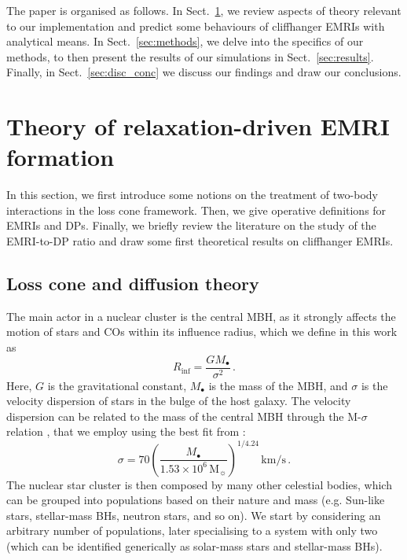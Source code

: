 \documentclass[desactivate]{aa}
\begin{document}
   The paper is organised as follows. In Sect.\ \ref{sec:theory}, we review aspects of theory relevant to our implementation and predict some behaviours of cliffhanger EMRIs with analytical means. In Sect.\ \ref{sec:methods}, we delve into the specifics of our methods, to then present the results of our simulations in Sect.\ \ref{sec:results}. Finally, in Sect.\ \ref{sec:disc_conc} we discuss our findings and draw our conclusions.


\section{Theory of relaxation-driven EMRI formation} \label{sec:theory}   

    In this section, we first introduce some notions on the treatment of two-body interactions in the loss cone framework. Then, we give operative definitions for EMRIs and DPs. Finally, we briefly review the literature on the study of the EMRI-to-DP ratio and draw some first theoretical results on cliffhanger EMRIs.

    \subsection{Loss cone and diffusion theory} \label{sec:losscone_diff}

        The main actor in a nuclear cluster is the central MBH, as it strongly affects the motion of stars and COs within its influence radius, which we define in this work as \citep{1972ApJ...178..371P}
        \begin{equation}
            R_\mathrm{inf} = \frac{G M_\bullet}{\sigma^2} \, .
        \end{equation}
        Here, $G$ is the gravitational constant, $M_\bullet$ is the mass of the MBH, and $\sigma$ is the velocity dispersion of stars in the bulge of the host galaxy. The velocity dispersion can be related to the mass of the central MBH through the M-$\sigma$ relation \citep{2000ApJ...539L...9F,2000ApJ...539L..13G}, that we employ using the best fit from \citet{2009ApJ...698..198G}:
        \begin{equation}
            \sigma = 70 \left( \frac{M_\bullet}{1.53 \times 10^6 \, \mathrm{M}_\sun}\right)^{1/4.24} \, \mathrm{km/s} \, .
        \end{equation}
The nuclear star cluster is then composed by many other celestial bodies, which can be grouped into populations based on their nature and mass (e.g. 
Sun-like stars, stellar-mass BHs, neutron stars, and so on). We start by considering an arbitrary number of populations, later specialising to a system with only two (which can be identified generically as solar-mass stars and stellar-mass BHs).
        
\end{document}
